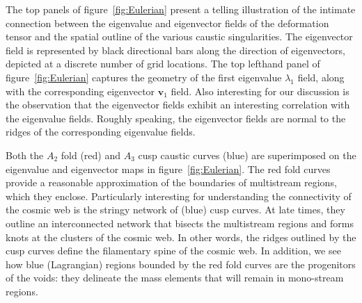 \documentclass[a4paper, 11pt]{article}
\begin{document}
\bigskip
The top panels of figure~\ref{fig:Eulerian} present a telling illustration of the intimate connection between the eigenvalue and eigenvector fields of the deformation tensor and the spatial outline of the various caustic singularities. The eigenvector field is represented by black directional bars along the direction of eigenvectors, depicted at a discrete number of grid locations. The top lefthand panel of figure~\ref{fig:Eulerian} captures the geometry of the first eigenvalue $\lambda_1$ field, along with the corresponding eigenvector $\bm{v}_1$ field.   Also interesting for our discussion is the observation that the eigenvector fields exhibit an interesting correlation with the eigenvalue fields. Roughly speaking, the eigenvector fields are normal to the ridges of the corresponding eigenvalue fields.

Both the $A_2$ fold (red) and $A_3$ cusp caustic curves (blue) are superimposed on the eigenvalue and eigenvector maps in figure~\ref{fig:Eulerian}. The red fold curves provide a reasonable approximation of the boundaries of multistream regions, which they enclose. Particularly interesting for understanding the connectivity of the cosmic web is the stringy network of (blue) cusp curves. At late times, they outline an interconnected network that bisects the multistream regions and forms knots at the clusters of the cosmic web. In other words, the ridges outlined by the cusp curves define the filamentary spine of the cosmic web. In addition, we see how blue (Lagrangian) regions bounded by the red fold curves are the progenitors of the voids: they delineate the mass elements that will remain in mono-stream regions. 
\end{document}

